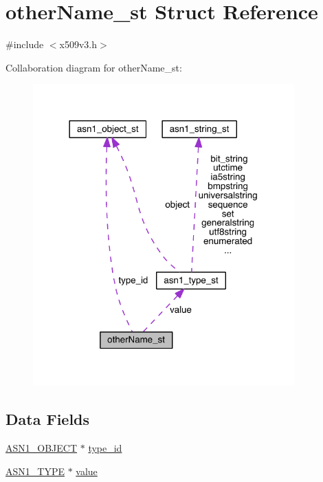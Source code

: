 \hypertarget{structother_name__st}{}\section{other\+Name\+\_\+st Struct Reference}
\label{structother_name__st}


{\ttfamily \#include $<$x509v3.\+h$>$}



Collaboration diagram for other\+Name\+\_\+st\+:\nopagebreak
\begin{figure}[H]
\begin{center}
\leavevmode
\includegraphics[width=285pt]{structother_name__st__coll__graph}
\end{center}
\end{figure}
\subsection*{Data Fields}
\begin{DoxyCompactItemize}
\item 
\hyperlink{crypto_2ossl__typ_8h_ae3fda0801e4c8e250087052bafb3ce2e}{A\+S\+N1\+\_\+\+O\+B\+J\+E\+CT} $\ast$ \hyperlink{structother_name__st_aa253ee6dcb746893797af3b0b7c3a084}{type\+\_\+id}
\item 
\hyperlink{crypto_2asn1_2asn1_8h_a7895e03d9fee2bc4963faf2a31a9439e}{A\+S\+N1\+\_\+\+T\+Y\+PE} $\ast$ \hyperlink{structother_name__st_ae12bae97bbd17ff056fbd409f3dc3a42}{value}
\end{DoxyCompactItemize}


